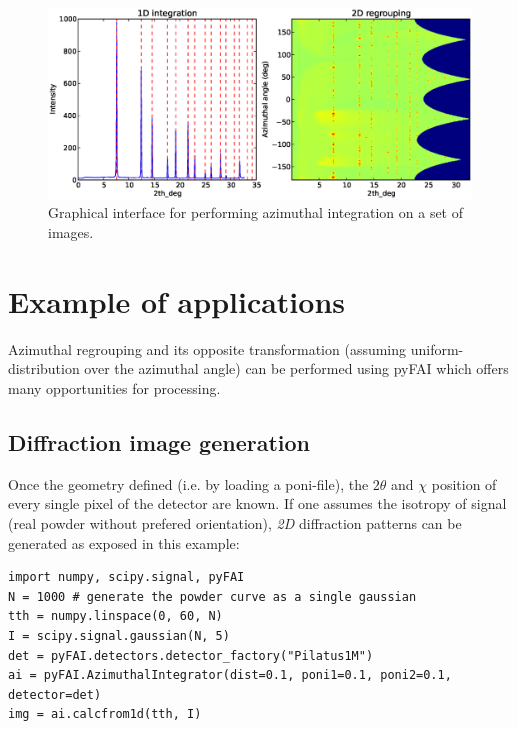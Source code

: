 \documentclass[preprint]{iucr}
\begin{document}
\begin{figure}
\label{pyFAI-integrate}
\begin{center}
\includegraphics[width=15cm]{integrate.eps}
\caption{Graphical interface for performing azimuthal integration on a set of
images.}
\end{center}
\end{figure}

\section{Example of applications}

Azimuthal regrouping and its opposite transformation (assuming
uniform-distribution over the azimuthal angle) can be performed
using pyFAI which offers many opportunities for processing.

\subsection{Diffraction image generation}

Once the geometry defined (i.e. by loading a poni-file), the $2\theta$ and
$\chi$ position of every single pixel of the detector are known.
If one assumes the isotropy of signal (real powder without prefered
orientation), \textit{2D} diffraction patterns can be generated as exposed in this
example:

\begin{verbatim}
import numpy, scipy.signal, pyFAI
N = 1000 # generate the powder curve as a single gaussian
tth = numpy.linspace(0, 60, N)
I = scipy.signal.gaussian(N, 5)
det = pyFAI.detectors.detector_factory("Pilatus1M")
ai = pyFAI.AzimuthalIntegrator(dist=0.1, poni1=0.1, poni2=0.1, detector=det)
img = ai.calcfrom1d(tth, I)
\end{verbatim}
\end{document}
